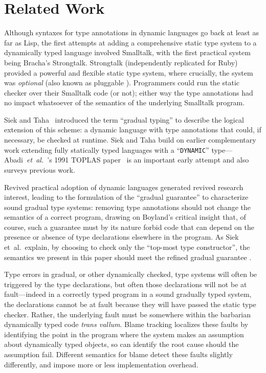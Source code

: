 
\section{Related Work}
\label{sec:related-work}

Although syntaxes for type annotations in dynamic languages go back at
least as far as Lisp\citep{cltl2}, the first attempts at adding a
comprehensive static type system to a dynamically typed
language involved 
Smalltalk\citep{RalphJohnson1986}, with the first practical system
being Bracha's Strongtalk\citep{strongtalk}. Strongtalk
(independently replicated for Ruby\citep{DBRuby09}) provided a
powerful and flexible static type system, where crucially, the system
was \emph{optional} (also known as pluggable
\cite{GiladPluggable2004}). Programmers could run the static checker
over their Smalltalk code (or not); either way the type annotations
had no impact whatsoever of the semantics of the underlying Smalltalk
program.

Siek and Taha~\cite{Siek2006} introduced the term ``gradual typing''
 to describe the logical extension of this scheme: a
dynamic language with type annotations that could, if necessary, be
checked at runtime. Siek and Taha build on earlier complementary work extending fully statically typed languages with a ``\texttt{DYNAMIC}''
type---Abadi~\textit{et~al.}~'s 1991 TOPLAS paper~\cite{AbadiTOPLAS1991} is an
important early attempt
and also surveys previous work.

Revived practical adoption of dynamic languages generated revived
research interest, leading to the formulation of the ``gradual
guarantee''\citep{Siek2006,XXXSiek2015} to characterize sound gradual
type systems: removing type annotations should not change the
semantics of a correct program, drawing on Boyland's critical insight
that, of course, such a guarantee must by its nature forbid code that
can depend on the presence or absence of type declarations elsewhere
in the program\citep{Boyland2014}.  As Siek et~al.\ explain, by
choosing to check only the ``top-most type constructor'', the
semantics we present in this paper should meet the refined gradual
guarantee \cite{XXXSiek2015}.


Type errors in gradual, or other dynamically checked, type systems will
often be triggered by the type declarations, but often those
declarations will not be at fault---indeed in a correctly typed
program in a sound gradually typed system,  the declarations cannot be
at fault because they will have passed the static type
checker. Rather, the underlying fault must be somewhere within the
barbarian dynamically typed code \emph{trans vallum}.
Blame tracking\citep{blame2009,blameThreesomes2010,blameForAll2011} localizes these
faults by identifying 
the point in the program where the system makes an 
assumption about dynamically typed objects, so can identify the root
cause should the assumption fail.  Different semantics for blame
detect these faults slightly differently, and impose more or less
implementation
overhead\citep{reticPython2014,monotonic2015,Vitousek2017}.

